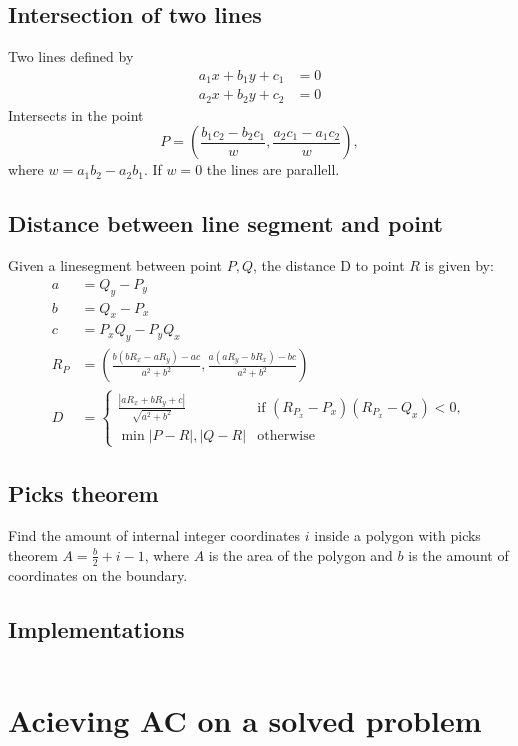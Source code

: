\documentclass[8pt,a4paper,landscape,oneside]{amsart}
\newcommand{\codep}[1]{\inputminted[fontsize=\large,baselinestretch=1]{py}{code/#1}}
\begin{document}
\begin{multicols*}{2}
\begin{large}
    \subsection{Intersection of two lines}
        Two lines defined by 
        \begin{align*}
            a_1x + b_1y + c_1 &= 0 \\
            a_2x + b_2y + c_2 &= 0 
        \end{align*}
        Intersects in the point 
        $$P = (\frac{b_1c_2 - b_2c_1}{w}, \frac{a_2c_1 - a_1c_2}{w}),$$
        where $w = a_1b_2 - a_2b_1$. If $w = 0$ the lines are parallell.
        \subsection{Distance between line segment and point}
        Given a linesegment between point $P, Q$, the distance D to point $R$ is given by:
        \begin{align*}
            a &= Q_y - P_y \\
            b &= Q_x - P_x \\
            c &= P_xQ_y - P_yQ_x \\
            R_P &= (\frac{b(bR_x - aR_y) - ac}{a^2 + b^2}, \frac{a(aR_y - bR_x) - bc}{a^2 + b^2}) \\
            D &= 
            \begin{cases}
                \frac{|aR_x + bR_y + c|}{\sqrt{a^2 + b^2}} & \text{if $(R_{P_x}- P_x)(R_{P_x} - Q_x) < 0$}, \\
                \min{|P - R|, |Q - R|} & \text{otherwise}
            \end{cases}
        \end{align*}
    \subsection{Picks theorem}
        Find the amount of internal integer coordinates $i$ inside a polygon with picks theorem
        $A = \frac{b}{2} + i - 1$, where $A$ is the area of the polygon and 
        $b$ is the amount of coordinates on the boundary.
    \subsection{Implementations}
        \codep{Geometry/geometry.py}
\section{Acieving AC on a solved problem}

\end{large}
\end{multicols*}
\end{document}
